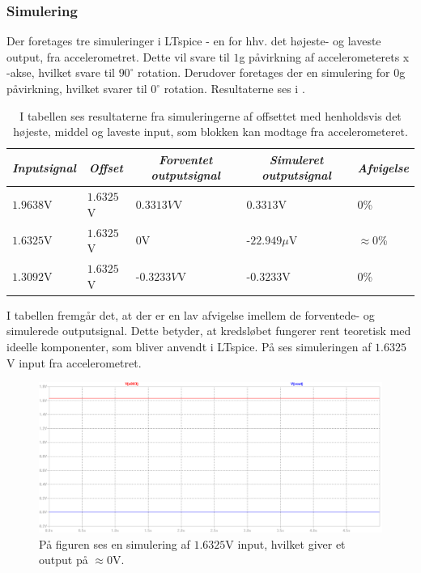 \subsubsection{Simulering}
Der foretages tre simuleringer i LTspice - en for hhv. det højeste- og laveste output, fra accelerometret. Dette vil svare til $1$g påvirkning af accelerometerets x -akse, hvilket svare til $90^{\circ}$ rotation. Derudover foretages der en simulering for $0$g påvirkning, hvilket svarer til $0^{\circ}$ rotation. Resultaterne ses i .
\begin{table}[H]
	\centering
	\begin{tabular}{|l|l|l|l|l|}
		\hline
		\multicolumn{1}{|c|}{\textit{Inputsignal}} & \multicolumn{1}{c|}{\textit{Offset}} & \multicolumn{1}{c|}{\textit{Forventet outputsignal}} & \multicolumn{1}{c|}{\textit{Simuleret outputsignal}} & \multicolumn{1}{c|}{\textit{Afvigelse}} \\ \hline
		$1.9638$V     & $1.6325$V    & $0.3313V$V    & $0.3313$V       & $0$\%              \\ \hline
		$1.6325$V     & $1.6325$V    & $0$V          & -$22.949\mu$V   & $\approx 0$\%      \\ \hline
		$1.3092$V     & $1.6325$V    & -$0.3233V$V   & -$0.3233$V      & $0$\%                \\ \hline
	\end{tabular}
	\caption{I tabellen ses resultaterne fra simuleringerne af offsettet med henholdsvis det højeste, middel og laveste input, som blokken kan modtage fra accelerometeret.}
	\label{Tab:offset_sim}
\end{table}
\noindent I tabellen fremgår det, at der er en lav afvigelse imellem de forventede- og simulerede outputsignal. Dette betyder, at kredsløbet fungerer rent teoretisk med ideelle komponenter, som bliver anvendt i LTspice. På  ses simuleringen af $1.6325$V input fra accelerometret.
 
\begin{figure}[H]
\centering
\includegraphics[scale=0.3]{figures/cProblemloesning/Offset_simulering.png}
\caption{På figuren ses en simulering af $1.6325$V input, hvilket giver et output på $\approx 0$V.}
\label{fig:Offset_simulering}
\end{figure}

